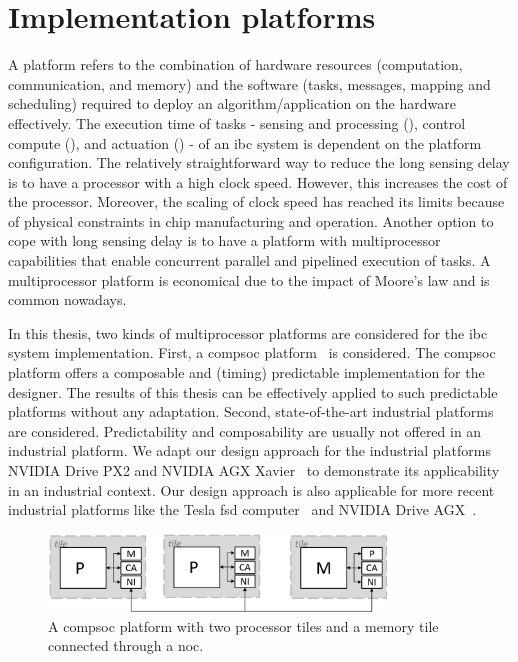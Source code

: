 \section{Implementation platforms}

A platform refers to the combination of hardware resources (computation, communication, and memory) and the software (tasks, messages, mapping and scheduling) required to deploy an algorithm/application on the hardware effectively.
The execution time of tasks - sensing and processing (\taskS), control compute (\taskC), and actuation (\taskA) - of an \gls{ibc} system is dependent on the platform configuration.
The relatively straightforward way to reduce the long sensing delay is to have a processor with a high clock speed. 
However, this increases the cost of the processor. Moreover, the scaling of clock speed has reached its limits because of physical constraints in chip manufacturing and operation.
Another option to cope with long sensing delay is to have a platform with multiprocessor capabilities that enable concurrent parallel and pipelined execution of tasks.
A multiprocessor platform is economical due to the impact of Moore's law and is common nowadays.

In this thesis, two kinds of multiprocessor platforms are considered for the \gls{ibc} system implementation.
First, a \gls{compsoc} platform~\cite{hansson2009compsoc} is considered.
The \gls{compsoc} platform offers a composable and (timing) predictable implementation for the designer. 
The results of this thesis can be effectively applied to such predictable platforms without any adaptation.
Second, state-of-the-art industrial platforms are considered.
Predictability and composability are usually not offered in an industrial platform. 
We adapt our design approach for the industrial platforms NVIDIA Drive PX2 and NVIDIA AGX Xavier~\cite{nvidiaAGX} to demonstrate its applicability in an industrial context.
Our design approach is also applicable for more recent industrial platforms like the Tesla \gls{fsd} computer~\cite{talpes2020compute} and NVIDIA Drive AGX~\cite{nvidiadrive}.

\begin{figure}[t]
\centerline{
    \includegraphics[width=0.8\textwidth]{01_intro/images/mpsoc_wo_index.png}
    }
    \caption{A \gls{compsoc} platform with two processor tiles and a memory tile connected through a \gls{noc}.}
    \label{fig:mpsoc}
\end{figure}

